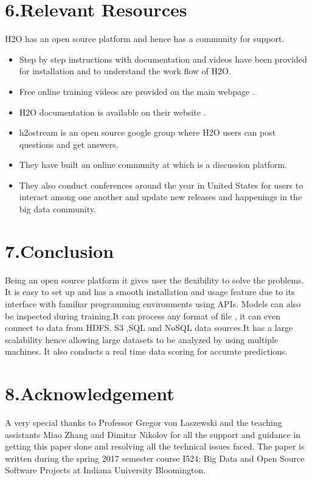 \documentclass[9pt,twocolumn,twoside]{../../styles/osajnl}
\begin{document}
\section {6.Relevant Resources}

H2O has an open source platform and hence has a community for support.
\begin{itemize}
\item Step by step instructions with documentation and videos have
   been provided for installation and to understand the work flow of
   H2O\cite{www-h2o-webpage}.
\item Free online training videos are provided on the main webpage
  \cite{www-h2o-learn}.
\item H2O documentation is available on their website
  \cite{www-h2o-webpage}.
\item h2ostream is an open source google group where H2O users can
    post questions and get answers.
\item They have built an online community at\cite{www-h2o-community}
  which is a discussion platform.
\item They also conduct conferences around the year in United States
    for users to interact among one another and update new releases
    and happenings in the big data community\cite{www-h2o-meetups}.
\end{itemize}

\section{7.Conclusion}
Being an open source platform it gives user the flexibility to solve
the problems. It is easy to set up and has a smooth installation and
usage feature due to its interface with familiar programming
environments using APIs\cite{www-h2o-why}. Models can also be
inspected during training.It can process any format of file , it can
even connect to data from HDFS, S3 ,SQL and NoSQL data
sources\cite{www-h2o-why}.It has a large scalability hence allowing
large datasets to be analyzed by using multiple machines. It also
conducts a real time data scoring for accurate
predictions\cite{www-h2o-why}.

\section{8.Acknowledgement}
A very special thanks to Professor Gregor von Laszewski and the
teaching assistants Miao Zhang and Dimitar Nikolov for all the support
and guidance in getting this paper done and resolving all the
technical issues faced. The paper is written during the spring 2017
semester course {I524: Big Data and Open Source Software Projects} at
Indiana University Bloomington.
\end{document}
